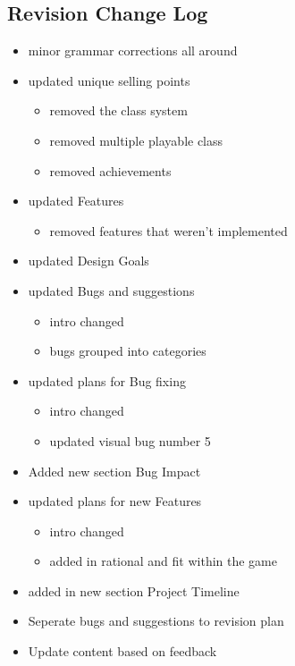 \documentclass{article}
\begin{document}
\subsection*{Revision Change Log}
\begin{itemize}
	\item minor grammar corrections all around 
	\item updated unique selling points 
	  \begin{itemize}
	  	\item{removed the class system}
	  	\item{removed multiple playable class}
	  	\item{removed achievements}
	  \end{itemize}
	\item  updated Features 
	  \begin{itemize}
	  	\item{removed features that weren't implemented }	
	  \end{itemize}
	  	\item  updated Design Goals
	\item  updated Bugs and suggestions
		  \begin{itemize}
		  	\item{intro changed}
		  	\item{bugs grouped into categories}	
		  \end{itemize}
		  \item updated plans for Bug fixing
		  	  \begin{itemize}
		  	  	\item{intro changed}
		  	  	\item{updated visual bug number 5}	
		  	  \end{itemize}
		  	  \item Added new section Bug Impact
		  	  \item updated plans for new Features 
		  	    	  \begin{itemize}
		  	    	  	\item{intro changed}
		  	    	  	\item{added in rational and fit within the game}	
		  	    	  \end{itemize}
		  	    	  \item added in new section Project Timeline
	\item  Seperate bugs and suggestions to revision plan
	\item Update content based on feedback 
\end{itemize}
\end{document}

